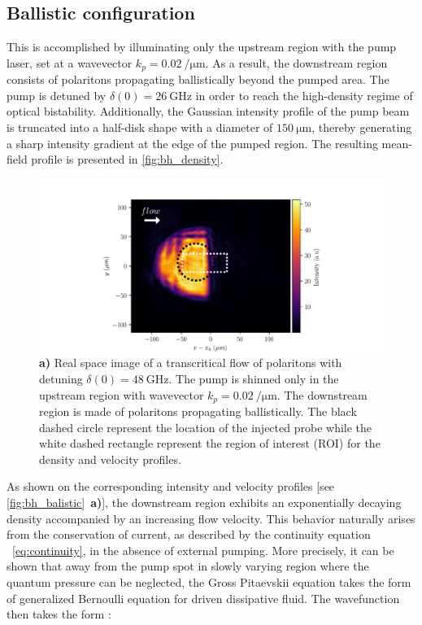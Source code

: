 \subsection{Ballistic configuration}

This is accomplished by illuminating only the upstream region with the pump laser, set at a wavevector \(k_p = \SI{0.02}{\per \micro \meter}\). As a result, the downstream region consists of polaritons propagating ballistically beyond the pumped area.
The pump is detuned by \(\delta(0) = \SI{26}{\giga \hertz}\) in order to reach the high-density regime of optical bistability. Additionally, the Gaussian intensity profile of the pump beam is truncated into a half-disk shape with a diameter of \(\SI{150}{\micro \meter}\), thereby generating a sharp intensity gradient at the edge of the pumped region. 
The resulting mean-field profile is presented in \autoref{fig:bh_density}.

\begin{figure}[htbp]
    \centering
    \includegraphics[width=1\textwidth]{chap_stimulated_hawking/fig/bh_density.pdf}
    \caption{\textbf{a)} Real space image of a transcritical flow of polaritons with detuning $\delta(0)=\SI{48}{\giga\hertz}$. The pump is shinned only 
    in the upstream region with wavevector $k_p=\SI{0.02}{\per \micro \meter}$.
    The downstream region is made of polaritons propagating ballistically. The black dashed circle represent the location of the injected probe while the white dashed rectangle represent the region 
    of interest (ROI) for the density and velocity profiles. }
    \label{fig:bh_density}
\end{figure}

As shown on the corresponding intensity and velocity profiles [see \autoref{fig:bh_balistic}~\textbf{a)}], the downstream region exhibits an exponentially decaying density accompanied by an increasing flow velocity. 
This behavior naturally arises from the conservation of current, as described by the continuity equation ~\ref{eq:continuity}, in the absence of external pumping. More precisely, it can be shown that 
away from the pump spot in slowly varying region where the quantum pressure can be neglected, the Gross Pitaevskii equation takes the form of generalized Bernoulli equation for driven dissipative fluid. The wavefunction then takes the form \cite{carusotto_inhomogeneous_2008}: 

